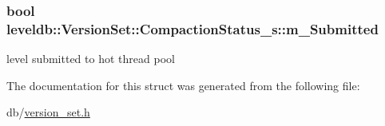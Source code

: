 \subsubsection[{m\+\_\+\+Submitted}]{\setlength{\rightskip}{0pt plus 5cm}bool leveldb\+::\+Version\+Set\+::\+Compaction\+Status\+\_\+s\+::m\+\_\+\+Submitted}\label{structleveldb_1_1_version_set_1_1_compaction_status__s_a65911d1ca6b5a49cde2ce0b79908523d}


level submitted to hot thread pool 



The documentation for this struct was generated from the following file\+:\begin{DoxyCompactItemize}
\item 
db/\hyperlink{version__set_8h}{version\+\_\+set.\+h}\end{DoxyCompactItemize}
